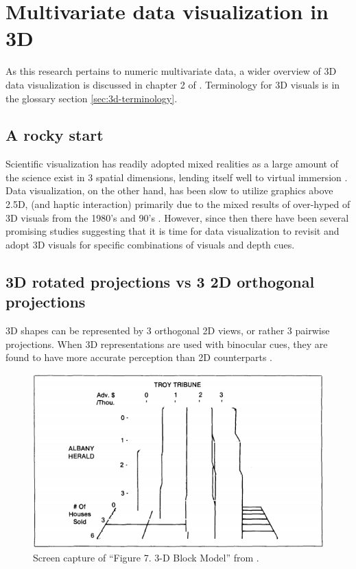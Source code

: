 \documentclass{monashthesis}
\begin{document}
\section{Multivariate data visualization in 3D}\label{sec:3d}

As this research pertains to numeric multivariate data, a wider overview
of 3D data visualization is discussed in chapter 2 of
\textcite{marriott_immersive_2018}. Terminology for 3D visuals is in the
glossary section \ref{sec:3d-terminology}.

\subsection{A rocky start}\label{a-rocky-start}

Scientific visualization has readily adopted mixed realities as a large
amount of the science exist in 3 spatial dimensions, lending itself well
to virtual immersion \autocite{marriott_immersive_2018}. Data
visualization, on the other hand, has been slow to utilize graphics
above 2.5D, (and haptic interaction) primarily due to the mixed results
of over-hyped of 3D visuals from the 1980's and 90's
\autocite{munzner_visualization_2014}. However, since then there have
been several promising studies suggesting that it is time for data
visualization to revisit and adopt 3D visuals for specific combinations
of visuals and depth cues.

\subsection{3D rotated projections vs 3 2D orthogonal
projections}\label{d-rotated-projections-vs-3-2d-orthogonal-projections}

3D shapes can be represented by 3 orthogonal 2D views, or rather 3
pairwise projections. When 3D representations are used with binocular
cues, they are found to have more accurate perception than 2D
counterparts \autocite[depicted in figure
\ref{fig:lee86fig}]{lee_effects_1986}.




\begin{figure}

{\centering \includegraphics[width=0.7\linewidth]{./figures/lee86fig} 

}

\caption{Screen capture of ``Figure 7. 3-D Block Model'' from
\textcite{lee_effects_1986}.}\label{fig:lee86fig}
\end{figure}
\end{document}
